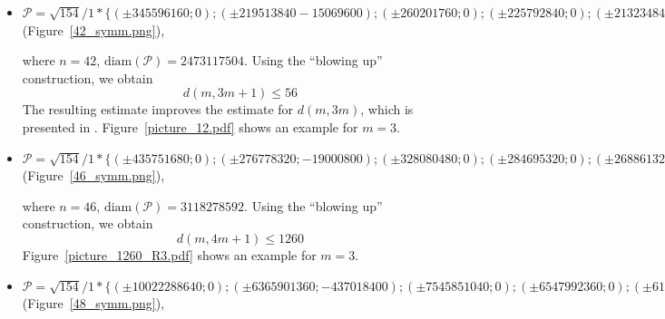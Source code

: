 \documentclass[12pt]{article}
\theoremstyle{theorem}
\theoremstyle{dfn}
\theoremstyle{remark}
\begin{document}
\begin{itemize}
\setlength{\itemsep}{-1mm}


\item
$\mathcal{P}=\sqrt{154}/{1} * \{ (\pm 345596160; 0);
(\pm219513840 -15069600);
(\pm260201760; 0);
(\pm225792840; 0);
(\pm213234840; 0);
(\pm153961080; 0);
(\pm144668160; 0
(\pm25116000; 0);
(\pm694026840; 0);
(\pm514710560; 0);
(\pm359116940; 0);
(\pm13423904; 0);
(\pm75682880; 0);
(\pm464143680; 0);
(\pm827069880; 0);
(\pm92144325; 0);
(\pm1195180740; 0);
(\pm1236558752; 0);
(\pm44590560; 0);
(\pm339925740; 0);
(\pm117312468; 0)\}
$
(Figure~\ref{42_symm.png}),

where $n = 42$, $\operatorname{diam(\mathcal{P})} = 2473117504$. Using the ``blowing up''
construction, we obtain
\begin{equation}\label{result2}
d(m, 3m + 1) \leq 56
\end{equation}
The resulting estimate improves the estimate for $d(m, 3m)$, which is presented
in \cite{kemnitz1988punktmengen}. Figure~\ref{picture_12.pdf} shows an example
for $m = 3$.


\item
$\mathcal{P}=\sqrt{154}/{1} * \{ (\pm435751680; 0);
(\pm276778320; -19000800);
(\pm328080480; 0);
(\pm284695320; 0);
(\pm268861320; 0);
(\pm194124840; 0);
(\pm182407680; 0);
(\pm31668000; 0);
(\pm1559139296; 0);
(\pm1506967020; 0);
(\pm1042827240; 0);
(\pm875077320; 0);
(\pm648982880; 0);
(\pm585224640; 0);
(\pm452799620; 0);
(\pm95426240; 0);
(\pm16925792; 0);
(\pm116181975; 0);
(\pm428602020; 0);
(\pm56222880; 0);
(\pm769560480; 0);
(\pm626458560; 0);
(\pm130761918; 0)\}
$
(Figure~\ref{46_symm.png}),

where $n = 46$, $\operatorname{diam(\mathcal{P})} = 3118278592$. Using the ``blowing up''
construction, we obtain
\begin{equation}\label{result3}
d(m, 4m + 1) \leq 1260
\end{equation}
Figure~\ref{picture_1260_R3.pdf} shows an example for $m = 3$.

\item
$\mathcal{P}=\sqrt{154}/{1} * \{ (\pm10022288640; 0);
( \pm6365901360 ; -437018400); 
( \pm7545851040 ; 0); 
( \pm6547992360 ; 0); 
( \pm6183810360 ; 0); 
( \pm4464871320 ; 0); 
( \pm4195376640 ; 0); 
( \pm728364000 ; 0); 
( \pm35860203808 ; 0); 
( \pm34660241460 ; 0); 
( \pm23985026520 ; 0); 
( \pm20126778360 ; 0); 
( \pm14926606240 ; 0); 
( \pm13460166720 ; 0); 
( \pm10414391260 ; 0); 
( \pm2194803520 ; 0); 
( \pm389293216 ; 0); 
( \pm2672185425 ; 0); 
( \pm9857846460 ; 0); 
( \pm1293126240 ; 0); 
( \pm17699891040 ; 0); 
( \pm14408546880 ; 0); 
( \pm3007524114 ; 0); 
( \pm3402061572 ; 0)\}
$
(Figure~\ref{48_symm.png}),

\end{itemize}
\end{document}
